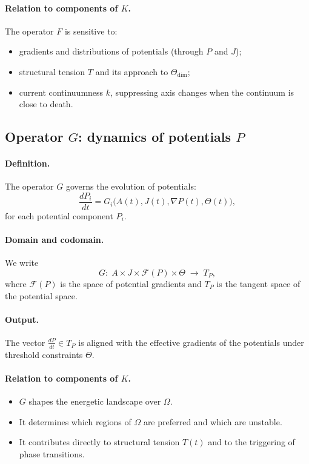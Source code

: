 \paragraph{Relation to components of \texorpdfstring{\(K\)}{K}.}
The operator \(F\) is sensitive to:
\begin{itemize}
  \item gradients and distributions of potentials (through \(P\) and \(J\));
  \item structural tension \(T\) and its approach to \(\Theta_{\mathrm{dim}}\);
  \item current continuumness \(k\), suppressing axis changes when the continuum is close to death.
\end{itemize}

\subsection{Operator \texorpdfstring{\(G\)}{G}: dynamics of potentials \texorpdfstring{\(P\)}{P}}

\paragraph{Definition.}
The operator \(G\) governs the evolution of potentials:
\[
  \frac{dP_i}{dt} = G_i\bigl(A(t),J(t),\nabla P(t),\Theta(t)\bigr),
\]
for each potential component \(P_i\).

\paragraph{Domain and codomain.}
We write
\[
  G:\; A\times J\times \mathcal{F}(P)\times\Theta \;\longrightarrow\; T_P,
\]
where \(\mathcal{F}(P)\) is the space of potential gradients and \(T_P\) is the tangent space of the potential space.

\paragraph{Output.}
The vector \(\frac{dP}{dt}\in T_P\) is aligned with the effective gradients of the potentials under threshold constraints \(\Theta\).

\paragraph{Relation to components of \texorpdfstring{\(K\)}{K}.}
\begin{itemize}
  \item \(G\) shapes the energetic landscape over \(\Omega\).
  \item It determines which regions of \(\Omega\) are preferred and which are unstable.
  \item It contributes directly to structural tension \(T(t)\) and to the triggering of phase transitions.
\end{itemize}

